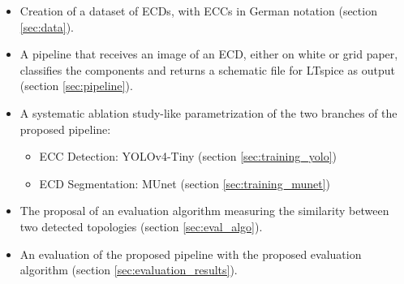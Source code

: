\begin{itemize}
    \item Creation of a dataset of \acp{ECD}, with \acp{ECC} in German notation (section \ref{sec:data}).

    \item A pipeline that receives an image of an \ac{ECD}, either on white or grid paper, classifies the components and returns a schematic file for LTspice as output (section \ref{sec:pipeline}).

    \item A systematic ablation study-like parametrization of the two branches of the proposed pipeline:
    \begin{itemize}
        \item \ac{ECC} Detection: \ac{YOLOv4}-Tiny (section \ref{sec:training_yolo})
        \item \ac{ECD} Segmentation: \ac{MUnet} (section \ref{sec:training_munet})
    \end{itemize}

    \item The proposal of an evaluation algorithm measuring the similarity between two detected topologies (section \ref{sec:eval_algo}).

    \item An evaluation of the proposed pipeline with the proposed evaluation algorithm (section \ref{sec:evaluation_results}).
\end{itemize}
